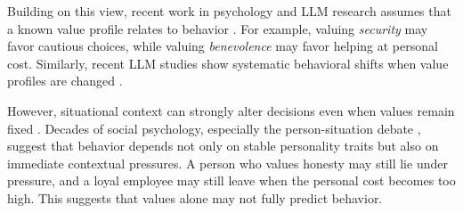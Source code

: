 \documentclass[11pt]{article}
\begin{document}
Building on this view, recent work in psychology and LLM research assumes that a known value profile relates to behavior \citep{jiao2025ai, backmann2025ethics}. For example, valuing \textit{security} may favor cautious choices, while valuing \textit{benevolence} may favor helping at personal cost. Similarly, recent LLM studies show systematic behavioral shifts when value profiles are changed \citep{sauter2026between, guo2026counterfactual}.

However, situational context can strongly alter decisions even when values remain fixed \citep{nabizadeh2026large, sauter2026between, harry2026beyond, backmann2025ethics}. Decades of social psychology, especially the person-situation debate \citep{harry2026beyond, soni2025we, peterson2025context}, suggest that behavior depends not only on stable personality traits but also on immediate contextual pressures. A person who values honesty may still lie under pressure, and a loyal employee may still leave when the personal cost becomes too high. This suggests that values alone may not fully predict behavior.



\end{document}
